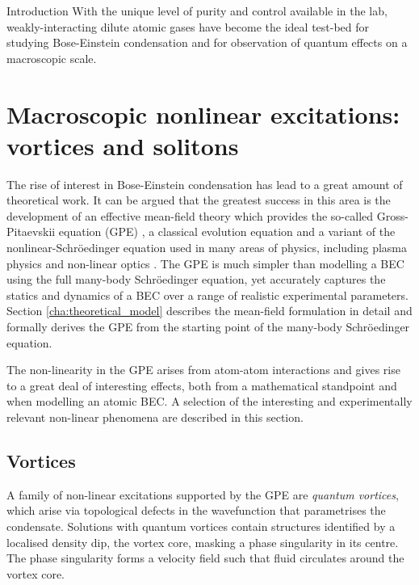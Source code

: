 \begin{chapter}{\label{cha:bose_gases}Introduction}
With the unique level of purity and control available in the lab, weakly-interacting dilute atomic gases have become the ideal test-bed for studying Bose-Einstein condensation and for observation of quantum effects on a macroscopic scale.


\section{Macroscopic nonlinear excitations: vortices and solitons}
The rise of interest in Bose-Einstein condensation has lead to a great amount of theoretical work. It can be argued that the greatest success in this area is the development of an effective mean-field theory which provides the so-called Gross-Pitaevskii equation (GPE) \cite{Pethick,Pitaevskii61,Gross61,RevModPhys.71.463}, a classical evolution equation and a variant of the nonlinear-Schr\"oedinger equation used in many areas of physics, including plasma physics \cite{PhysRevLett.37.693} and non-linear optics \cite{PhysRevA.65.053614,borisSolitons}. The GPE is much simpler than modelling a BEC using the full many-body Schr\"oedinger equation, yet accurately captures the statics and dynamics \cite{RevModPhys.71.463,Denschlag97, Burger99, PhysRevLett.86.2926, Dutton27072001,vortices,lobo_2004,PhysRevLett.85.2857} of a BEC over a range of realistic experimental parameters. Section \ref{cha:theoretical_model} describes the mean-field formulation  in detail and formally derives the GPE from the starting point of the many-body Schr\"oedinger equation.

The non-linearity in the GPE arises from atom-atom interactions and gives rise to a great deal of interesting effects, both from a mathematical standpoint and when modelling an atomic BEC. A selection of the interesting and experimentally relevant non-linear phenomena are described in this section.

\subsection{Vortices}
A family of non-linear excitations supported by the GPE are {\it quantum vortices}, which arise via topological defects in the wavefunction that parametrises the condensate. Solutions with quantum vortices contain structures identified by a localised density dip, the vortex core, masking a phase singularity in its centre. The phase singularity forms a velocity field such that fluid circulates around the vortex core.


\end{chapter}
